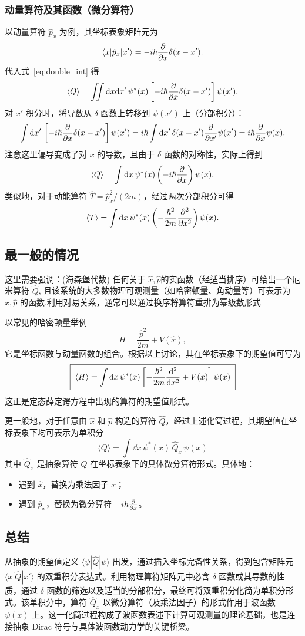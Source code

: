 \subsubsection{动量算符及其函数（微分算符）}
以动量算符 $\hat{p}_x$ 为例，其坐标表象矩阵元为
\[
\langle x | \hat{p}_x | x' \rangle = -i\hbar \pdv{x} \delta(x - x').
\]
代入式~\eqref{eq:double_int} 得
\[
\langle Q \rangle = \iint \dd x \dd x' \, \psi^*(x) \left[ -i\hbar \pdv{x} \delta(x - x') \right] \psi(x').
\]
对 $x'$ 积分时，将导数从 $\delta$ 函数上转移到 $\psi(x')$ 上（分部积分）：
\[
\int \dd x' \, \left[ -i\hbar \pdv{x} \delta(x - x') \right] \psi(x') = i\hbar \int \dd x' \, \delta(x - x') \pdv{x'} \psi(x') = i\hbar \pdv{x} \psi(x).
\]
注意这里偏导变成了对 $x$ 的导数，且由于 $\delta$ 函数的对称性，实际上得到
\[
\langle Q \rangle = \int \dd x \, \psi^*(x) \left( -i\hbar \pdv{x} \right) \psi(x).
\]
类似地，对于动能算符 $\hat{T} = \hat{p}_x^2/(2m)$，经过两次分部积分可得
\[
\langle T \rangle = \int \dd x \, \psi^*(x) \left( -\frac{\hbar^2}{2m} \pdv[2]{x} \right) \psi(x).
\]

\subsection{最一般的情况}
这里需要强调：(海森堡代数) 任何关于 \(\hat x,\hat p\)的实函数（经适当排序）可给出一个厄米算符 \(\hat Q\), 且该系统的大多数物理可观测量（如哈密顿量、角动量等）可表示为 \(\hat x,\hat p\) 的函数.利用对易关系，通常可以通过换序将算符重排为幂级数形式

以常见的哈密顿量举例
\[
\hat{H} = \frac{\hat{p}^2}{2m} + V(\hat{x}),
\]
它是坐标函数与动量函数的组合。根据以上讨论，其在坐标表象下的期望值可写为
\[
\boxed{\; \langle H \rangle = \int \dd x \, \psi^*(x) \left[ -\frac{\hbar^2}{2m} \dv[2]{x} + V(x) \right] \psi(x) \;}
\]
这正是定态薛定谔方程中出现的算符的期望值形式。

更一般地，对于任意由 $\hat{x}$ 和 $\hat{p}$ 构造的算符 $\hat{Q}$，经过上述化简过程，其期望值在坐标表象下均可表示为单积分
\[
\boxed{\; \langle Q \rangle = \int \dd x \, \psi^*(x) \, \hat{Q}_x \, \psi(x) \;}
\]
其中 $\hat{Q}_x$ 是抽象算符 $\hat{Q}$ 在坐标表象下的具体微分算符形式。具体地：
\begin{itemize}
	\item 遇到 $\hat{x}$，替换为乘法因子 $x$；
	\item 遇到 $\hat{p}_x$，替换为微分算符 $-i\hbar \pdv{x}$。
\end{itemize}

\subsection{总结}
从抽象的期望值定义 $\langle \psi | \hat{Q} | \psi \rangle$ 出发，通过插入坐标完备性关系，得到包含矩阵元 $\langle x | \hat{Q} | x' \rangle$ 的双重积分表达式。利用物理算符矩阵元中必含 $\delta$ 函数或其导数的性质，通过 $\delta$ 函数的筛选以及适当的分部积分，最终可将双重积分化简为单积分形式。该单积分中，算符 $\hat{Q}_x$ 以微分算符（及乘法因子）的形式作用于波函数 $\psi(x)$ 上。这一化简过程构成了波函数表述下计算可观测量的理论基础，也是连接抽象 Dirac 符号与具体波函数动力学的关键桥梁。